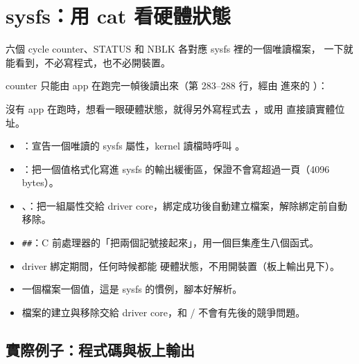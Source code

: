 \clearpage
\section{sysfs：用 cat 看硬體狀態}
\label{sec:sysfs}

\begin{oneline}
六個 cycle counter、STATUS 和 NBLK 各對應 sysfs 裡的一個唯讀檔案， 一下就能看到，不必寫程式，也不必開裝置。
\end{oneline}

\begin{before}
counter 只能由 app 在跑完一幀後讀出來（第 283–288 行，經由  進來的 ）：


沒有 app 在跑時，想看一眼硬體狀態，就得另外寫程式去  ，或用  直接讀實體位址。
\end{before}

\begin{tech}
\begin{itemize}
\item {}：宣告一個唯讀的 sysfs 屬性，kernel 讀檔時呼叫 。
\item {}：把一個值格式化寫進 sysfs 的輸出緩衝區，保證不會寫超過一頁（4096 bytes）。
\item {}、：把一組屬性交給 driver core，綁定成功後自動建立檔案，解除綁定前自動移除。
\item \texttt{\#\#}：C 前處理器的「把兩個記號接起來」，用一個巨集產生八個函式。
\end{itemize}
\end{tech}

\begin{gain}
\begin{itemize}
\item driver 綁定期間，任何時候都能  硬體狀態，不用開裝置（板上輸出見下）。
\item 一個檔案一個值，這是 sysfs 的慣例，腳本好解析。
\item 檔案的建立與移除交給 driver core，和  /  不會有先後的競爭問題。
\end{itemize}
\end{gain}

\subsection{實際例子：程式碼與板上輸出}

